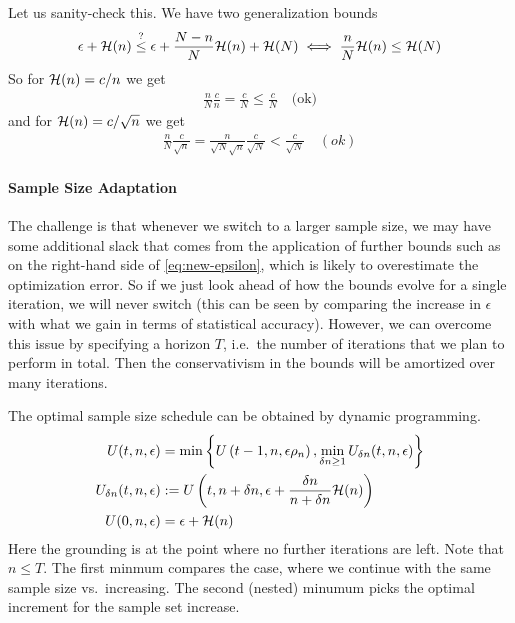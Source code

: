 \documentclass{article}
\newcommand{\bound}{{\cal H}}
\begin{document}
Let us sanity-check this. We have two generalization bounds 
\begin{align}
\epsilon + \bound(n) 
\stackrel{?}{\le}
\epsilon + \frac{N-n}{N} \bound(n) + \bound(N)  
\iff \frac nN \bound(n) \le \bound(N)
\end{align}
So for $\bound(n) = c/n$ we get 
\begin{align}
\frac nN  \frac{c}{n} = \frac cN \leq \frac cN \quad \text{(ok)}
\end{align}
and for $\bound(n) = c/\sqrt{n}$ we get  
\begin{align}
\frac nN  \frac{c}{\sqrt n}  = \frac{n}{\sqrt{N} \sqrt{n}}  \frac{c}{ \sqrt N} < \frac c {\sqrt{N}} \quad (ok)
\end{align}

\paragraph{Sample Size Adaptation}

The challenge is that whenever we switch to a larger sample size, we may have some additional slack that comes from the application of further bounds such as on the right-hand side of \eqref{eq:new-epsilon}, which is likely to overestimate the optimization error. So if we just look ahead of how the bounds evolve for a single iteration, we will never switch (this can be seen by comparing the increase in $\epsilon$ with what we gain in terms of statistical accuracy). However, we can overcome this issue by specifying a horizon $T$, i.e.~the number of iterations that we plan to perform in total. Then the conservativism in the bounds will be amortized over many iterations. 

The optimal sample size schedule  can be obtained by dynamic programming. 
\begin{align}
U(t,n,\epsilon)  
& = \min \left\{ U \left(t-1,n, \epsilon \rho_n \right),  \min_{\delta n \ge 1} U_{\delta n}(t,n,\epsilon) \right\} 
\label{eq:recursion_first}\\
U_{\delta n}(t,n,\epsilon)  
& :=  U \left(t, n + \delta n, \epsilon  + \frac{\delta n}{n+\delta n} \bound(n) \right) \\
U(0,n,\epsilon) &= \epsilon + \bound(n)
\end{align}
Here the grounding is at the point where no further iterations are left. Note that $n \le T$. The first minmum compares the case, where we continue with the same sample size vs.~increasing. The second (nested) minumum picks the optimal increment for the sample set increase.  
\end{document}
